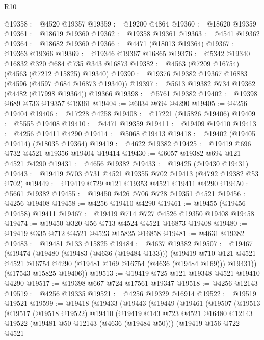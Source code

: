 \begin{lexlean}{R10}
\begin{coremodule}
@19358 := @4520 @19357
@19359 := @19200 @4864
@19360 := @18620 @19359
@19361 := @18619 @19360
@19362 := @19358 @19361
@19363 := @4541 @19362
@19364 := @18682 @19360
@19366 := @4471 (@18013 @19364)
@19367 := @19363 @19366
@19369 := @19346 @19367 @16865
@19376 := @5342 @19340 @16832 @320 @684 @735 @343 @16873
@19382 := @4563 (@7209 @16754) (@4563 (@7212 @15825) @19340)
@19390 := @19376 @19382 @19367 @16883 (@4596 (@4597 @684 @16873 @19340))
@19397 := @5613 @19382 @734 @19362 (@4482 (@17998 @19364)) @19366
@19398 := @5761 @19382
@19402 := @19398 @689 @733 @19357 @19361
@19404 := @6034 @694 @4290
@19405 := @4256 @19404
@19406 := @17228 @4258
@19408 := @17221 (@15826 @19406)
@19409 := @5555 @19408
@19410 := @4471 @19359
@19411 := @19409 @19410
@19413 := @4256 @19411 @4290
@19414 := @5068 @19413
@19418 := @19402 (@19405 @19414) (@18035 @19364)
@19419 := @4622 @19382
@19425 := @19419 @696 @732 @4521 @19356 @19404 @19414
@19430 := @6057 @19382 @694 @121 @4521 @4290
@19431 := @4656 @19382
@19433 := @19425 (@19430 @19431)
@19443 := @19419 @703 @731 @4521 @19355 @702 @19413 (@4792 @19382 @53 @702)
@19449 := @19419 @729 @121 @19353 @4521 @19411 @4290
@19450 := @5661 @19382
@19455 := @19450 @426 @706 @728 @19351 @4521
@19456 := @4256 @19408
@19458 := @4256 @19410 @4290
@19461 := @19455 (@19456 @19458) @19411
@19467 := @19419 @714 @727 @4526 @19350 @19408 @19458
@19474 := @19450 @320 @56 @713 @4524 @4521 @16873 @19408
@19480 := @19419 @335 @712 @4521 @4523 @15825 @16858
@19481 := @4631 @19382
@19483 := @19481 @133 @15825
@19484 := @4637 @19382
@19507 := @19467
    (@19474
      (@19480
        (@19483 (@4636 (@19484 @133)))
        (@19419
          @710
          @121
          @4521
          @4521
          @16754
          @4290
          (@19481 @169 @16754 (@4636 (@19484 @169)))
          @19431))
      (@17543 @15825 @19406))
@19513 := @19419 @725 @121 @19348 @4521 @19410 @4290
@19517 := @19398 @667 @724 @17561 @19347
@19518 := @4256 @12143
@19519 := @4256 @19335
@19521 := @4256 @19329 @16914
@19522 := @19519 @19521
@19599 := @19418
    (@19433
      (@19443
        (@19449
          (@19461
            (@19507
              (@19513
                (@19517
                  (@19518 @19522)
                  @19410
                  (@19419
                    @143
                    @723
                    @4521
                    @16480
                    @12143
                    @19522
                    (@19481 @50 @12143 (@4636 (@19484 @50)))
                    (@19419
                      @156
                      @722
                      @4521

\end{coremodule}
\end{lexlean}
